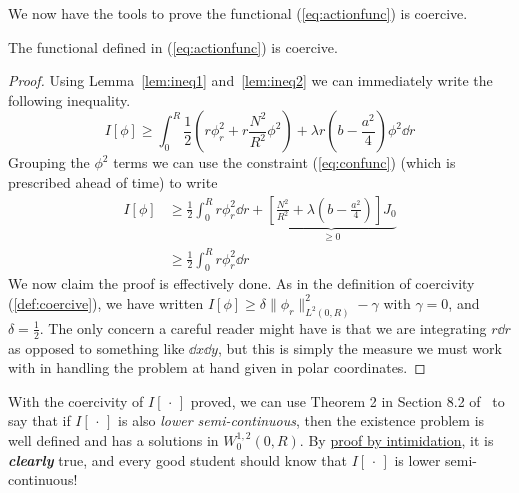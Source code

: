 We now have the tools to prove the functional (\ref{eq:actionfunc}) is coercive.
\begin{theorem}
    The functional defined in (\ref{eq:actionfunc}) is coercive.
\end{theorem}
\begin{proof}
    Using Lemma~\ref{lem:ineq1} and~\ref{lem:ineq2} we can immediately write the
    following inequality.
    \begin{equation}
        I[\phi] \geq \int_0^R\frac{1}{2}\left(r\phi_r^2 + r\frac{N^2}{R^2}\phi^2\right) + \lambda r\left(b - \frac{a^2}{4}\right)\phi^2\dd{r}
    \end{equation}
    Grouping the \(\phi^2\) terms we can use the constraint (\ref{eq:confunc})
    (which is prescribed ahead of time) to write
    \begin{align}
        I[\phi] & \geq \frac{1}{2}\int_0^R r\phi_r^2\dd{r} + \underbrace{\left[\frac{N^2}{R^2} + \lambda \left(b - \frac{a^2}{4}\right)\right]J_0}_{\geq 0} \\
                & \geq \frac{1}{2}\int_0^R r\phi_r^2\dd{r}
    \end{align}
    We now claim the proof is effectively done. As in the definition of
    coercivity (\ref{def:coercive}), we have written \(I[\phi]\geq \delta\|\phi_r\|^2_{L^2(0,R)} - \gamma\)
    with \(\gamma = 0 \), and \(\delta = \frac{1}{2}\). The only concern a
    careful reader might have is that we are integrating \(r\dd{r}\) as opposed
    to something like \(\dd{x}\dd{y}\), but this is simply the measure we must
    work with in handling the problem at hand given in polar coordinates.
\end{proof}

With the coercivity of \(I[\,\cdot\,]\) proved, we can use Theorem 2 in Section
8.2 of~\cite{PDE} to say that if \(I[\,\cdot\,]\) is also
\textit{lower semi-continuous}, then the existence problem is well defined and
has a solutions in \(W^{1,2}_0(0,R)\). By \href{https://en.wikipedia.org/wiki/Proof_by_intimidation}{proof by intimidation},
it is \textit{\textbf{clearly}} true, and every good student should know that
\(I[\,\cdot\,]\) is lower semi-continuous!
